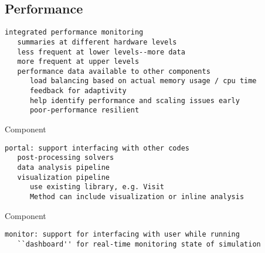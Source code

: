 \documentclass[10pt,twocolumn]{article}
\begin{document}
\subsection{Performance} \label{ss:design-performance}

{\tiny
\begin{verbatim}
integrated performance monitoring
   summaries at different hardware levels
   less frequent at lower levels--more data
   more frequent at upper levels
   performance data available to other components
      load balancing based on actual memory usage / cpu time
      feedback for adaptivity
      help identify performance and scaling issues early
      poor-performance resilient
\end{verbatim}

 Component

\begin{verbatim}
portal: support interfacing with other codes
   post-processing solvers
   data analysis pipeline
   visualization pipeline
      use existing library, e.g. Visit
      Method can include visualization or inline analysis
\end{verbatim}

 Component

\begin{verbatim}
monitor: support for interfacing with user while running
   ``dashboard'' for real-time monitoring state of simulation
\end{verbatim}




}
\end{document}
